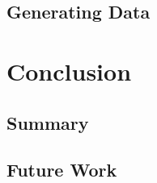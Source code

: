\documentclass[12pt,a4paper]{article}
\begin{document}
\subsection{Generating Data}

\subsection{}
\section{Conclusion}\label{conclusion}
\subsection{Summary}\label{summary}
\subsection{Future Work}\label{futurework}



\end{document}
